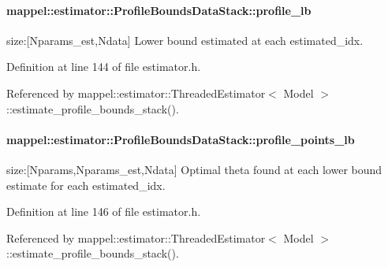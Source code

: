 \paragraph[{\texorpdfstring{profile\+\_\+lb}{profile_lb}}]{ mappel\+::estimator\+::\+Profile\+Bounds\+Data\+Stack\+::profile\+\_\+lb}\hypertarget{structmappel_1_1estimator_1_1ProfileBoundsDataStack_ae37af08a6f31e748d44763a9fd83c5b1}{}\label{structmappel_1_1estimator_1_1ProfileBoundsDataStack_ae37af08a6f31e748d44763a9fd83c5b1}


size\+:\mbox{[}Nparams\+\_\+est,Ndata\mbox{]} Lower bound estimated at each estimated\+\_\+idx. 



Definition at line 144 of file estimator.\+h.



Referenced by mappel\+::estimator\+::\+Threaded\+Estimator$<$ Model $>$\+::estimate\+\_\+profile\+\_\+bounds\+\_\+stack().

\paragraph[{\texorpdfstring{profile\+\_\+points\+\_\+lb}{profile_points_lb}}]{ mappel\+::estimator\+::\+Profile\+Bounds\+Data\+Stack\+::profile\+\_\+points\+\_\+lb}\hypertarget{structmappel_1_1estimator_1_1ProfileBoundsDataStack_ad5bd4f39d5046e582fe8be78567664af}{}\label{structmappel_1_1estimator_1_1ProfileBoundsDataStack_ad5bd4f39d5046e582fe8be78567664af}


size\+:\mbox{[}Nparams,Nparams\+\_\+est,Ndata\mbox{]} Optimal theta found at each lower bound estimate for each estimated\+\_\+idx. 



Definition at line 146 of file estimator.\+h.



Referenced by mappel\+::estimator\+::\+Threaded\+Estimator$<$ Model $>$\+::estimate\+\_\+profile\+\_\+bounds\+\_\+stack().


